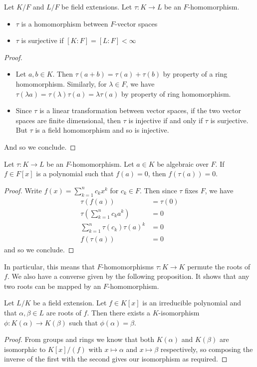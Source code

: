 \documentclass[a4paper]{article}
\begin{document}
\begin{prp}{}{} Let $K/F$ and $L/F$ be field extensions. Let $\tau:K\to L$ be an $F$-homomorphism. 
\begin{itemize}
\item $\tau$ is a homomorphism between $F$-vector spaces
\item $\tau$ is surjective if $[K:F]=[L:F]<\infty$
\end{itemize} \tcbline
\begin{proof}~\\
\begin{itemize}
\item Let $a,b\in K$. Then $\tau(a+b)=\tau(a)+\tau(b)$ by property of a ring homomorphism. Similarly, for $\lambda\in F$, we have $\tau(\lambda a)=\tau(\lambda)\tau(a)=\lambda\tau(a)$ by property of ring homomorphism. 
\item Since $\tau$ is a linear transformation between vector spaces, if the two vector spaces are finite dimensional, then $\tau$ is injective if and only if $\tau$ is surjective. But $\tau$ is a field homomorphism and so is injective. 
\end{itemize}
And so we conclude. 
\end{proof}
\end{prp}

\begin{lmm}{}{} Let $\tau:K\to L$ be an $F$-homomorphism. Let $a\in K$ be algebraic over $F$. If $f\in F[x]$ is a polynomial such that $f(a)=0$, then $f(\tau(a))=0$. \tcbline
\begin{proof}
Write $f(x)=\sum_{k=1}^nc_kx^k$ for $c_k\in F$. Then since $\tau$ fixes $F$, we have 
\begin{align*}
\tau(f(a))&=\tau(0)\\
\tau\left(\sum_{k=1}^nc_ka^k\right)&=0\\
\sum_{k=1}^n\tau(c_k)\tau(a)^k&=0\tag{$\tau$ is a field homomorphism}\\
f(\tau(a))&=0
\end{align*}
and so we conclude. 
\end{proof}
\end{lmm}

In particular, this means that $F$-homomorphisms $\tau:K\to K$ permute the roots of $f$. We also have a converse given by the following proposition. It shows that any two roots can be mapped by an $F$-homomorphism. 

\begin{prp}{}{} Let $L/K$ be a field extension. Let $f\in K[x]$ is an irreducible polynomial and that $\alpha,\beta\in L$ are roots of $f$. Then there exists a $K$-isomorphism $\phi:K(\alpha)\to K(\beta)$ such that $\phi(\alpha)=\beta$. \tcbline
\begin{proof}
From groups and rings we know that both $K(\alpha)$ and $K(\beta)$ are isomorphic to $K[x]/(f)$ with $x\mapsto\alpha$ and $x\mapsto\beta$ respectively, so composing the inverse of the first with the second gives our isomorphism as required. 
\end{proof}
\end{prp}
\end{document}
